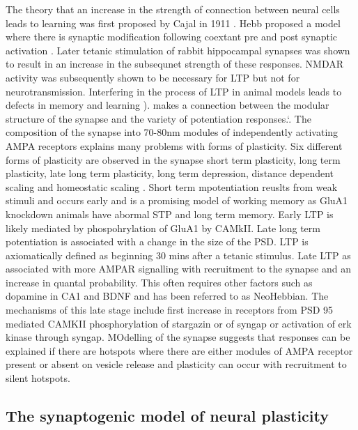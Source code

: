 The theory that an increase in the strength of connection between neural cells leads to learning was first proposed by Cajal in 1911 \cite{nicoll2017brief}. Hebb proposed a model where there is synaptic modification following coextant pre and post synaptic activation \cite{hebb1949organization_check}. Later tetanic stimulation of rabbit hippocampal synapses was shown to result in an increase in the subsequnet strength of these responses.\cite{bliss1973long} NMDAR activity was subsequently shown to be necessary for LTP \cite{collingridge1983excitatory} but not for neurotransmission. 
 Interfering in the process of LTP in animal models leads to defects in memory and learning \cite{lisman2012mechanisms}).
 \cite{lisman2017glutamatergic} makes a connection between the modular structure of the synapse and the variety of potentiation responses.`. The composition of the synapse into 70-80nm modules of independently activating AMPA receptors explains many problems with forms of plasticity.
 Six different forms of plasticity are observed in the synapse short term plasticity, long term plasticity, late long term plasticity, long term depression, distance dependent scaling and homeostatic scaling \cite{lisman2017glutamatergic}. Short term mpotentiation reuslts from weak stimuli and occurs early and is a promising model of working memory as GluA1 knockdown animals have abormal STP and long term memory. Early LTP is likely mediated by phospohrylation of GluA1 by CAMkII. Late long term potentiation is associated with a change in the size of the PSD. LTP is axiomatically defined as beginning 30 mins after a tetanic stimulus. Late LTP as associated with more AMPAR signalling with recruitment to the synapse and an increase in quantal probability. This often requires other factors such as dopamine in CA1 and BDNF and has been referred to as NeoHebbian. The mechanisms of this late stage include first increase in receptors from PSD 95 mediated  CAMKII phosphorylation of stargazin or of syngap or activation of erk kinase through syngap. 
 MOdelling of the synapse suggests that responses can be explained if there are hotspots where there are either modules of AMPA receptor present or absent on vesicle release and plasticity can occur with recruitment to silent hotspots. 
 
 
\subsection{The synaptogenic model of neural plasticity}


